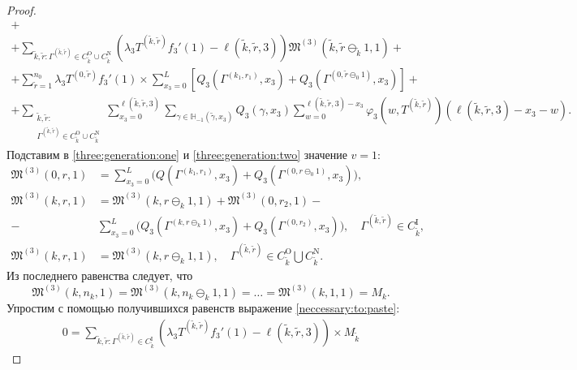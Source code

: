 \begin{proof}
\begin{multline}
 +\\+ \sum_{\tilde{k}, \tilde{r}\colon \Gamma^{(\tilde{k},  \tilde{r})} \in C_{\tilde{k}}^{\mathrm{O}}\cup C_{\tilde{k}}^{\mathrm{N}}} (\lambda_3 T^{(\tilde{k}, \tilde{r})} f_3'(1) - \ell(\tilde{k}, \tilde{r}, 3)) \mathfrak{M}^{(3)}(\tilde{k}, \tilde{r}\ominus_{\tilde{k}} 1, 1)   +\\+ \sum_{\tilde{r}=1}^{n_0} \lambda_3 T^{(0, \tilde{r})} f_3'(1)  \times \sum_{x_3=0}^{L} \left[ Q_3(\Gamma^{(k_1, r_1)}, x_3) + Q_3(\Gamma^{(0, \tilde{r}\ominus_0 1)}, x_3) \right]   +\\+   \sum_{\substack{\tilde{k}, \tilde{r}\colon \\ \Gamma^{(\tilde{k},  \tilde{r})} \in C_{\tilde{k}}^{\mathrm{O}}\cup C_{\tilde{k}}^{\mathrm{N}}}} \sum_{x_3=0}^{\ell(\tilde{k}, \tilde{r}, 3)}\sum_{\gamma \in {\mathbb H}_{-1}(\tilde{\gamma}, x_3)} Q_3(\gamma, x_3) \sum_{w=0}^{\ell(\tilde{k}, \tilde{r}, 3) - x_3} \varphi_3(w, T^{(\tilde{k}, \tilde{r})}) (\ell(\tilde{k}, \tilde{r}, 3)-x_3 - w).
 \label{neccessary:to:paste}
\end{multline}
Подставим в \eqref{three:generation:one} и \eqref{three:generation:two} значение $v=1$:
\begin{align*}
    \mathfrak{M}^{(3)}(0, r, 1) &= \sum_{x_3=0}^{L} \biggl(Q(\Gamma^{(k_1, r_1)},  x_3) + Q_3(\Gamma^{(0, r\ominus_{0}1)},  x_3) \biggr), \\
    \mathfrak{M}^{(3)}(k, r, 1) &=\mathfrak{M}^{(3)}(k, r\ominus_{k}1, 1) +\mathfrak{M}^{(3)}(0, r_2, 1)-\\
    - &\sum_{x_3=0}^{L} \biggl(Q_3(\Gamma^{(k, r\ominus_{k}1)},  x_3) + Q_3(\Gamma^{(0, r_2)},  x_3) \biggr),   
    \quad \Gamma^{(\tilde{k},  \tilde{r})} \in C_{\tilde{k}}^{\mathrm{I}},\\
    \mathfrak{M}^{(3)}(k, r, 1) &= \mathfrak{M}^{(3)}(k, r\ominus_k 1, 1),  \quad \Gamma^{(\tilde{k},  \tilde{r})} \in C_{\tilde{k}}^{\mathrm{O}} \bigcup C_{\tilde{k}}^{\mathrm{N}}.
\end{align*}
Из последнего равенства следует,  что 
$$
\mathfrak{M}^{(3)}(k, n_k, 1) =  \mathfrak{M}^{(3)}(k, n_k\ominus_k 1, 1) = \ldots =  \mathfrak{M}^{(3)}(k, 1, 1) = M_k.
$$
Упростим с помощью получившихся равенств выражение \eqref{neccessary:to:paste}:
\begin{multline}
 0 = \sum_{\tilde{k}, \tilde{r}\colon \Gamma^{(\tilde{k},  \tilde{r})} \in C_{\tilde{k}}^{\mathrm{I}}} (\lambda_3 T^{(\tilde{k}, \tilde{r})} f_3'(1) - \ell(\tilde{k}, \tilde{r}, 3))
     \times   M_{\tilde{k}}

\end{multline}
\end{proof}
